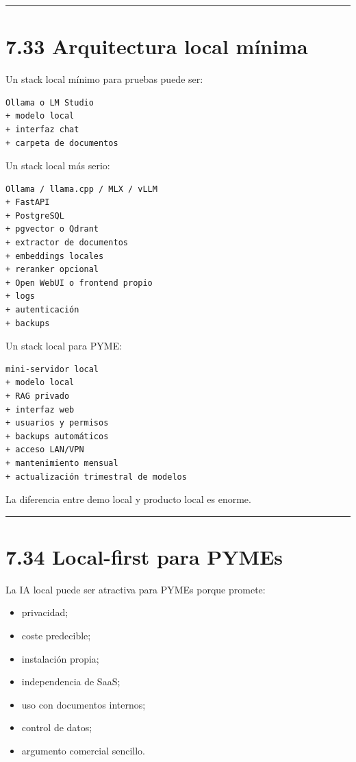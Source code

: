 \begin{center}\rule{0.5\linewidth}{0.5pt}\end{center}

\section{7.33 Arquitectura local
mínima}\label{arquitectura-local-muxednima}

Un stack local mínimo para pruebas puede ser:

\begin{lstlisting}
Ollama o LM Studio
+ modelo local
+ interfaz chat
+ carpeta de documentos
\end{lstlisting}

Un stack local más serio:

\begin{lstlisting}
Ollama / llama.cpp / MLX / vLLM
+ FastAPI
+ PostgreSQL
+ pgvector o Qdrant
+ extractor de documentos
+ embeddings locales
+ reranker opcional
+ Open WebUI o frontend propio
+ logs
+ autenticación
+ backups
\end{lstlisting}

Un stack local para PYME:

\begin{lstlisting}
mini-servidor local
+ modelo local
+ RAG privado
+ interfaz web
+ usuarios y permisos
+ backups automáticos
+ acceso LAN/VPN
+ mantenimiento mensual
+ actualización trimestral de modelos
\end{lstlisting}

La diferencia entre demo local y producto local es enorme.

\begin{center}\rule{0.5\linewidth}{0.5pt}\end{center}

\section{7.34 Local-first para PYMEs}\label{local-first-para-pymes}

La IA local puede ser atractiva para PYMEs porque promete:

\begin{itemize}
\tightlist
\item
  privacidad;
\item
  coste predecible;
\item
  instalación propia;
\item
  independencia de SaaS;
\item
  uso con documentos internos;
\item
  control de datos;
\item
  argumento comercial sencillo.
\end{itemize}

